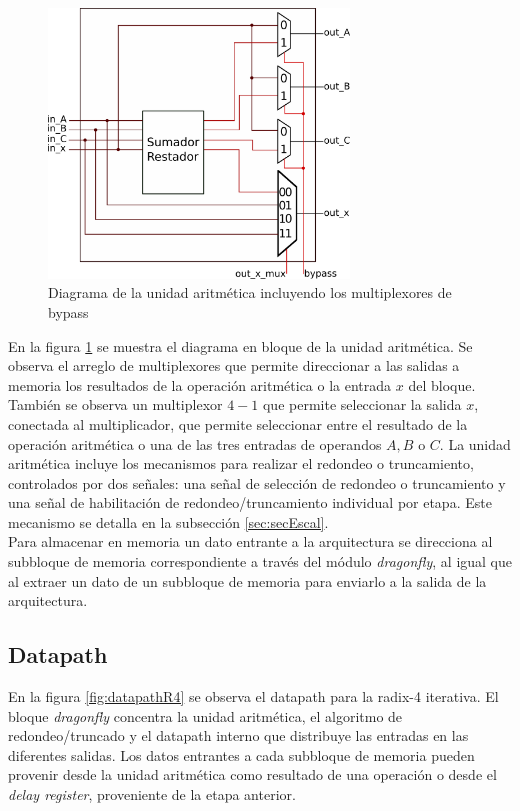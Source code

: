 \begin{figure}[htb!]
        \centering
        \includegraphics[width=8cm]{./figures/firefly.png}
        \caption{Diagrama de la unidad aritmética incluyendo los multiplexores de bypass}
        \label{fig:firefly}
\end{figure}

En la figura \ref{fig:firefly} se muestra el diagrama en bloque de la unidad aritmética. Se observa
el arreglo de multiplexores que permite direccionar a las salidas a memoria los resultados de la
operación aritmética o la entrada $x$ del bloque. También se observa un multiplexor $4-1$ que
permite seleccionar la salida $x$, conectada al multiplicador, que permite seleccionar entre el
resultado de la operación aritmética o una de las tres entradas de operandos $A, B$ o $C$. 
La unidad aritmética incluye los mecanismos para realizar el redondeo o truncamiento, controlados
por dos señales: una señal de selección de redondeo o truncamiento y una señal de habilitación de 
redondeo/truncamiento individual por etapa. Este mecanismo se detalla en la subsección
\ref{sec:secEscal}.\\
Para almacenar en memoria un dato entrante a la arquitectura se direcciona al subbloque de memoria
correspondiente a través del módulo \textit{dragonfly}, al igual que al extraer un dato de un
subbloque de memoria para enviarlo a la salida de la arquitectura.

\subsection{Datapath}
En la figura \ref{fig:datapathR4} se observa el datapath para la radix-4 iterativa. El bloque
\textit{dragonfly} concentra la unidad aritmética, el algoritmo de redondeo/truncado y el datapath
interno que distribuye las entradas en las diferentes salidas. Los datos entrantes a cada subbloque
de memoria pueden provenir desde la unidad aritmética como resultado de una operación o desde el
\textit{delay register}, proveniente de la etapa anterior.

